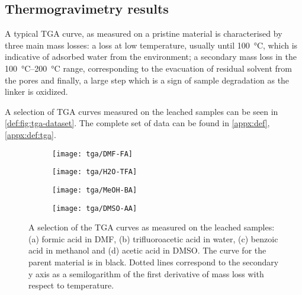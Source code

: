 
\subsection{Thermogravimetry results}

A typical \gls{TGA} curve, as measured on a pristine material
is characterised by three main mass losses: a loss
at low temperature, usually until \SI{100}{\degreeCelsius},
which is indicative of adsorbed water from the environment;
a secondary mass loss in the \SIrange{100}{200}{\degreeCelsius}
range, corresponding to the evacuation of residual solvent 
from the pores and finally, a large step which is a sign of 
sample degradation as the linker is oxidized.

A selection of \gls{TGA} curves measured on the leached samples
can be seen in \autoref{def:fig:tga-dataset}. The complete set of data
can be found in \autoref{appx:def}, \autoref{appx:def:tga}.

\begin{figure}[htbp]
    \centering

    \begin{subfigure}{0.5\linewidth}
        \texttt{[image: tga/DMF-FA]}%
		\caption{}%
        \label{def:fig:tga-dmf-fa}
    \end{subfigure}%
    \begin{subfigure}{0.5\linewidth}
        \texttt{[image: tga/H2O-TFA]}%
		\caption{}%
        \label{def:fig:tga-h2o-tfa}
    \end{subfigure}%

    
    \begin{subfigure}{0.5\linewidth}
        \texttt{[image: tga/MeOH-BA]}%
		\caption{}%
        \label{def:fig:tga-meoh-ba}
    \end{subfigure}%
    \begin{subfigure}{0.5\linewidth}
        \texttt{[image: tga/DMSO-AA]}%
		\caption{}%
        \label{def:fig:tga-dmso-aa}
    \end{subfigure}%

    \caption{A selection of the \gls{TGA} curves as measured on the
    leached samples: (a) formic acid in \gls{DMF}, (b) trifluoroacetic
    acid in water, (c) benzoic acid in methanol and (d) acetic acid
    in \gls{DMSO}. The curve for the parent material is in black. 
    Dotted lines correspond to the secondary y axis as a 
    semilogarithm of the first derivative of mass loss with 
    respect to temperature.}%
    \label{def:fig:tga-dataset}
\end{figure}

